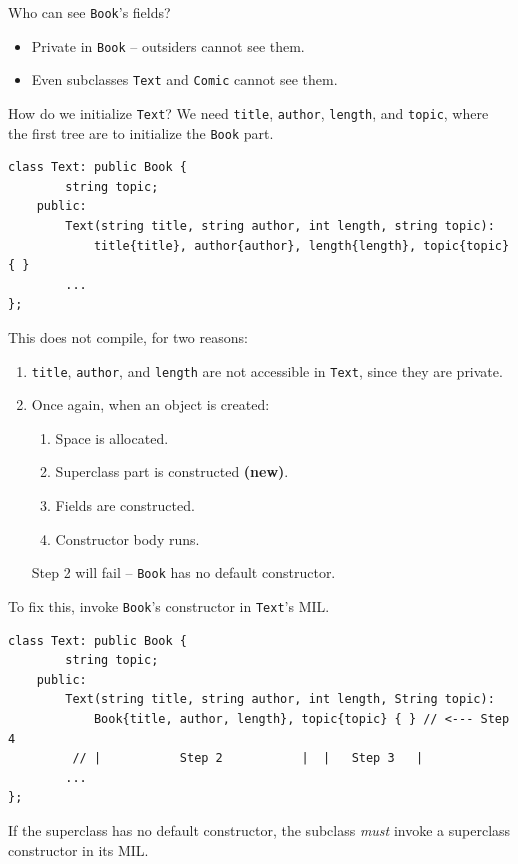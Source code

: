 \documentclass[11pt]{article}
\theoremstyle{definition}
\begin{document}
Who can see {\tt Book}'s fields?\vspace{-0.25cm}
\begin{itemize}
    \item Private in {\tt Book} -- outsiders cannot see them.
    \item Even subclasses {\tt Text} and {\tt Comic} cannot see them.
\end{itemize}
\vspace{-0.25cm}
How do we initialize {\tt Text}? We need {\tt title}, {\tt author}, {\tt length}, and {\tt topic}, where the first tree are to initialize the {\tt Book} part.
\begin{lstlisting}
class Text: public Book {
        string topic;
    public:
        Text(string title, string author, int length, string topic): 
            title{title}, author{author}, length{length}, topic{topic} { }
        ...
};
\end{lstlisting}
\vspace{-0.25cm}
This does not compile, for two reasons:\vspace{-0.25cm}
\begin{enumerate}[(1)]
\item {\tt title}, {\tt author}, and {\tt length} are not accessible in {\tt Text}, since they are private.
\item Once again, when an object is created:
\begin{enumerate}[1.]
\item Space is allocated.
\item Superclass part is constructed {\bf (new)}.
\item Fields are constructed.
\item Constructor body runs.
\end{enumerate}
Step 2 will fail -- {\tt Book} has no default constructor.
\end{enumerate}
\vspace{-0.25cm}
To fix this, invoke {\tt Book}'s constructor in {\tt Text}'s MIL.
\begin{lstlisting}
class Text: public Book {
        string topic;
    public:
        Text(string title, string author, int length, String topic):
            Book{title, author, length}, topic{topic} { } // <--- Step 4
         // |           Step 2           |  |   Step 3   |
        ...
};
\end{lstlisting}
\vspace{-0.25cm}
If the superclass has no default constructor, the subclass {\it must} invoke a superclass constructor in its MIL.
\end{document}
